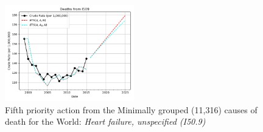\documentclass[10pt, a4paper, twocolumn]{IEEEconf}
\begin{document}
\begin{figure}[H]
  \centering
  \includegraphics[width=0.5\textwidth]{results/WORLD_ICD10_MINIMALLY_GROUPED/I509_ets.png}
  \caption{Fifth priority action from the Minimally grouped (11,316) causes of death for the World: \textit{Heart failure, unspecified (I50.9)}}\label{fig:k8e}
\end{figure}

\clearpage
\end{document}
